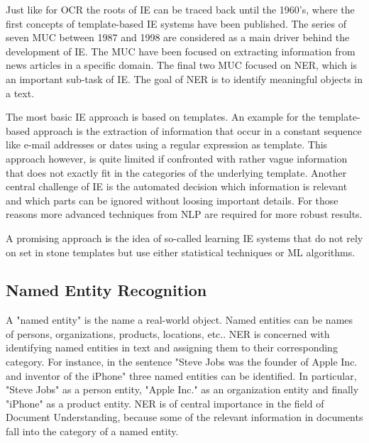 Just like for \ac{OCR} the roots of \ac{IE} can be traced back until the 1960's, where the first concepts of template-based \ac{IE} systems have been published. The series of seven \ac{MUC} between 1987 and 1998 are considered as a main driver behind the development of \ac{IE}. The \ac{MUC} have been focused on extracting information from news articles in a specific domain. The final two \acs{MUC} focused on \acf{NER}, which is an important sub-task of \ac{IE}. The goal of \ac{NER} is to identify meaningful objects in a text.
\cite{hobbs2010information,cowie1996information,black1998facile}

The most basic \ac{IE} approach is based on templates. An example for the template-based approach is the extraction of information that occur in a constant sequence like e-mail addresses or dates using a regular expression as template. This approach however, is quite limited if confronted with rather vague information that does not exactly fit in the categories of the underlying template. Another central challenge of \acf{IE} is the automated decision which information is relevant and which parts can be ignored without loosing important details. For those reasons more advanced techniques from \ac{NLP} are required for more robust results.
\cite{Wilks1997InformationEA,cowie1996information}

A promising approach is the idea of so-called learning \acf{IE} systems that do not rely on set in stone templates but use either statistical techniques or \ac{ML} algorithms. 
\cite{hobbs2010information,cardie1997empirical}

\subsection{Named Entity Recognition}
A "named entity" is the name a real-world object. Named entities can be names of persons, organizations, products, locations, etc..
\acf{NER} is concerned with identifying named entities in text and assigning them to their corresponding category. For instance, in the sentence "Steve Jobs was the founder of Apple Inc. and inventor of the iPhone" three named entities can be identified. In particular, "Steve Jobs" as a person entity, "Apple Inc." as an organization entity and finally "iPhone" as a product entity. \ac{NER} is of central importance in the field of Document Understanding, because some of the relevant information in documents fall into the category of a named entity. \cite{hobbs2010information,black1998facile}

